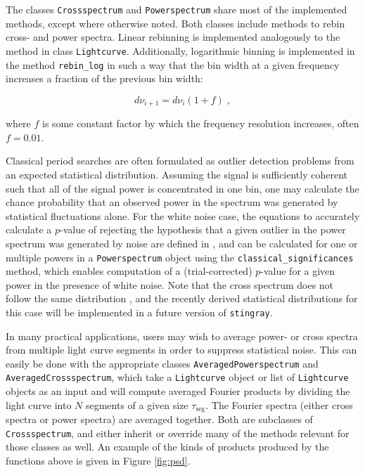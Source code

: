 \documentclass[twocolumn]{aastex62}
\newcommand{\stingray}{\texttt{stingray}\xspace}
\newcommand{\lightcurve}{\texttt{Lightcurve}\xspace}
\newcommand{\crossspectrum}{\texttt{Crossspectrum}\xspace}
\newcommand{\powerspectrum}{\texttt{Powerspectrum}\xspace}
\begin{document}
The classes \crossspectrum and \powerspectrum share most of the implemented methods, except where otherwise noted. Both classes include methods to rebin cross- and power spectra. Linear rebinning is implemented analogously to the method in class \lightcurve. Additionally, logarithmic binning is implemented in the method \texttt{rebin\_log} in such a way that the bin width at a given frequency increases a fraction of the previous bin width:

\[
d\nu_{i+1} = d\nu_{i} (1 + f) \; ,
\]

\noindent where $f$ is some constant factor by which the frequency resolution increases, often $f = 0.01$. 

Classical period searches are often formulated as outlier detection problems from an expected statistical distribution. Assuming the signal is sufficiently coherent such that all of the signal power is concentrated in one bin, one may calculate the chance probability that an observed power in the spectrum was generated by statistical fluctuations alone. For the white noise case, the equations to accurately calculate a $p$-value of rejecting the hypothesis that a given outlier in the power spectrum was generated by noise are defined in \citep{Groth1975}, and can be calculated for one or multiple powers in a \powerspectrum object using the \verb|classical_significances| method, which enables computation of a (trial-corrected) $p$-value for a given power in the presence of white noise.
Note that the cross spectrum does not follow the same distribution \citep{huppenkothen2017}, and the recently derived statistical distributions for this case will be implemented in a future version of \stingray. 

In many practical applications, users may wish to average power- or cross spectra from multiple light curve segments in order to suppress statistical noise. This can easily be done with the appropriate classes \texttt{AveragedPowerspectrum} and \texttt{AveragedCrossspectrum}, which take a \lightcurve object or list of \lightcurve objects as an input and will compute averaged Fourier products by dividing the light curve into $N$ segments of a given size $\tau_\mathrm{seg}$. The Fourier spectra (either cross spectra or power spectra) are averaged together. Both are subclasses of \crossspectrum, and either inherit or override many of the methods relevant for those classes as well. An example of the kinds of products produced by the functions above is given in Figure \ref{fig:psd}.
\end{document}
